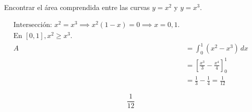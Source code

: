 \item Encontrar el área comprendida entre las curvas $y=x^2$ y $y=x^3$.

\nopagebreak
\begin{align*}
\text{Intersección: } x^2=x^3 \implies x^2(1-x)=0 \implies x=0, 1. \\
\text{En } [0,1], x^2 \ge x^3. \\
A &= \int_{0}^{1} (x^2 - x^3) \, dx \\
&= \left[ \frac{x^3}{3} - \frac{x^4}{4} \right]_{0}^{1} \\
&= \frac{1}{3} - \frac{1}{4} = \frac{1}{12}
\end{align*}

\[
\boxed{\displaystyle \frac{1}{12}}
\]
